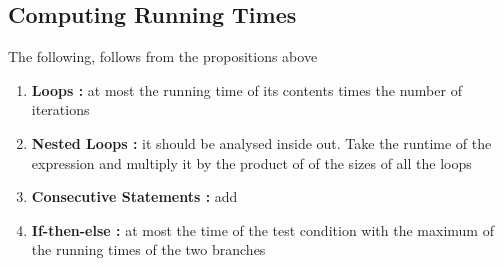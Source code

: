 \subsection{Computing Running Times}

	\par{The following, follows from the propositions above}

	\begin{enumerate}
			\item\textbf{Loops : } at most the running time of its contents times
					the number of iterations
			\item\textbf{Nested Loops : } it should be analysed inside out. Take
					the runtime of the expression and multiply it by the product
					of of the sizes of all the loops
			\item\textbf{Consecutive Statements : } add
			\item\textbf{If-then-else : } at most the time of the test condition
					with the maximum of the running times of the two branches
	\end{enumerate}

